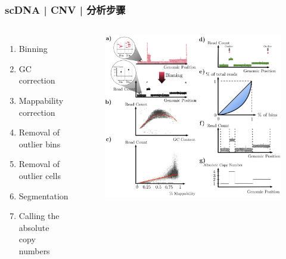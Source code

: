 \documentclass[11pt]{ctexbeamer}
\begin{document}
\begin{frame}
  \frametitle{scDNA | CNV | 分析步骤}
  \begin{columns}
    \begin{enumerate}
      \item Binning
      \item GC correction
      \item Mappability correction
      \item Removal of outlier bins
      \item Removal of outlier cells
      \item Segmentation
      \item Calling the absolute copy numbers
    \end{enumerate}
  \begin{figure}
    \centering
    \includegraphics[width=\textwidth]{scDNA_CNA_workflow_03.png}
  \end{figure}
  \end{columns}
\end{frame}
\end{document}
